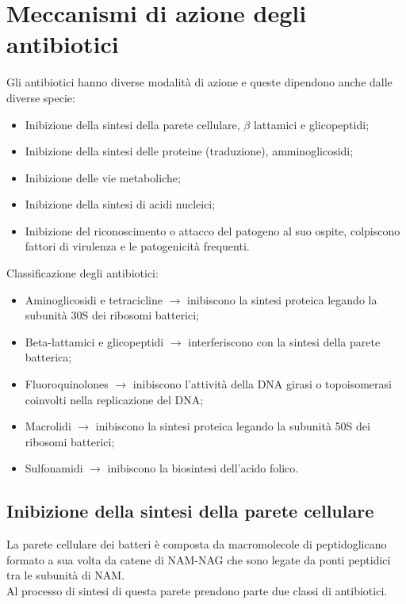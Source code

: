 \section{Meccanismi di azione degli antibiotici}
Gli antibiotici hanno diverse modalità di azione e queste dipendono anche dalle diverse specie:
\begin{itemize}
    \item Inibizione della sintesi della parete cellulare, $\beta$ lattamici e glicopeptidi;
    \item Inibizione della sintesi delle proteine (traduzione), amminoglicosidi;
    \item Inibizione delle vie metaboliche;
    \item Inibizione della sintesi di acidi nucleici;
    \item Inibizione del riconoscimento o attacco del patogeno al suo ospite, colpiscono fattori di virulenza e le patogenicità frequenti. 
\end{itemize}
Classificazione degli antibiotici:
\begin{itemize}
    \item Aminoglicosidi e tetracicline $\xrightarrow{}$ inibiscono la sintesi proteica legando la subunità 30S dei ribosomi batterici; 
    \item Beta-lattamici e glicopeptidi $\xrightarrow{}$ interferiscono con la sintesi della parete batterica;
    \item Fluoroquinolones $\xrightarrow{}$ inibiscono l'attività della DNA girasi o topoisomerasi coinvolti nella replicazione del DNA;
    \item Macrolidi $\xrightarrow{}$ inibiscono la sintesi proteica legando la subunità 50S dei ribosomi batterici;
    \item Sulfonamidi $\xrightarrow{}$ inibiscono la biosintesi dell'acido folico.
\end{itemize}
\subsection{Inibizione della sintesi della parete cellulare}
La parete cellulare dei batteri è composta da macromolecole di peptidoglicano formato a sua volta da catene di NAM-NAG che sono legate da ponti peptidici tra le subunità di NAM.
\\Al processo di sintesi di questa parete prendono parte due classi di antibiotici.
